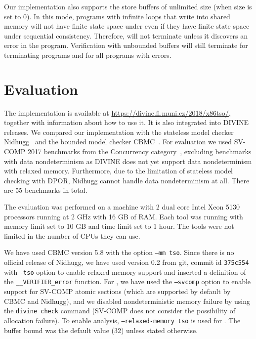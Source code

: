 Our implementation also supports the store buffers of unlimited size (when size
is set to 0). In this mode, programs with infinite loops that write into shared
memory will not have finite state space under \xtso even if they have finite
state space under sequential consistency.
Therefore, \divine will not terminate unless it discovers an error in the
program.
Verification with unbounded buffers will still terminate for terminating
programs and for all programs with errors.


\section{Evaluation} \label{sec:evaluation}

The implementation is available at \url{https://divine.fi.muni.cz/2018/x86tso/}, together with information about how to use it.
It is also integrated into DIVINE releases.
We compared our implementation with the stateless model checker Nidhugg~ and the bounded model checker CBMC~.
For evaluation we used SV-COMP 2017 benchmarks from the Concurrency
category~, excluding benchmarks with data
nondeterminism as
DIVINE does not yet support data nondeterminism with relaxed memory.
Furthermore, due to the limitation of stateless model checking with DPOR,
Nidhugg cannot handle data nondeterminism at all.
There are 55 benchmarks in total.

The evaluation was performed on a machine with 2 dual core Intel Xeon 5130
processors running at 2 GHz with 16 GB of RAM. Each tool was running with memory
limit set to 10 GB and time limit set to 1 hour. The tools were not limited in
the number of CPUs they can use.

We have used CBMC version 5.8 with the option \texttt{--mm tso}. Since there is no official release of Nidhugg, we have used version 0.2 from git, commit id
\texttt{375c554} with \texttt{-tso} option to enable relaxed memory support and inserted a definition of the \texttt{\_\_VERIFIER\_error} function.
For \divine, we have used the \texttt{--svcomp} option to enable support for SV-COMP atomic sections (which are supported by default by CBMC and Nidhugg), and we disabled nondeterministic memory failure by using the \texttt{divine check} command (SV-COMP does not consider the possibility of allocation failure).
To enable \xtso analysis, \texttt{--relaxed-memory tso} is used for \divine.
The buffer bound was the default value (32) unless stated otherwise.

